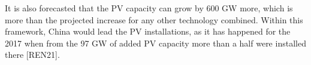It is also forecasted that the PV capacity can grow by 600 GW more, which is more than the projected increase for any other technology combined. Within this framework, China would lead the PV installations, as it has happened for the 2017 when from the 97 GW of added PV capacity more than a half were installed there [REN21]. 








